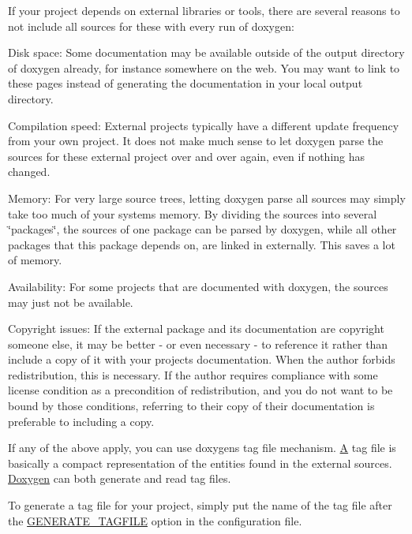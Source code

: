 If your project depends on external libraries or tools, there are several reasons to not include all sources for these with every run of doxygen\+:


\begin{DoxyDescription}
\item[Disk space\+:]Some documentation may be available outside of the output directory of doxygen already, for instance somewhere on the web. You may want to link to these pages instead of generating the documentation in your local output directory. 
\item[Compilation speed\+:]External projects typically have a different update frequency from your own project. It does not make much sense to let doxygen parse the sources for these external project over and over again, even if nothing has changed. 
\item[Memory\+:]For very large source trees, letting doxygen parse all sources may simply take too much of your system\textquotesingle{}s memory. By dividing the sources into several \char`\"{}packages\char`\"{}, the sources of one package can be parsed by doxygen, while all other packages that this package depends on, are linked in externally. This saves a lot of memory. 
\item[Availability\+:]For some projects that are documented with doxygen, the sources may just not be available. 
\item[Copyright issues\+:]If the external package and its documentation are copyright someone else, it may be better -\/ or even necessary -\/ to reference it rather than include a copy of it with your project\textquotesingle{}s documentation. When the author forbids redistribution, this is necessary. If the author requires compliance with some license condition as a precondition of redistribution, and you do not want to be bound by those conditions, referring to their copy of their documentation is preferable to including a copy.


\end{DoxyDescription}

If any of the above apply, you can use doxygen\textquotesingle{}s tag file mechanism. \mbox{\hyperlink{class_a}{A}} tag file is basically a compact representation of the entities found in the external sources. \mbox{\hyperlink{class_doxygen}{Doxygen}} can both generate and read tag files.

To generate a tag file for your project, simply put the name of the tag file after the \mbox{\hyperlink{config_cfg_generate_tagfile}{G\+E\+N\+E\+R\+A\+T\+E\+\_\+\+T\+A\+G\+F\+I\+LE}} option in the configuration file.

